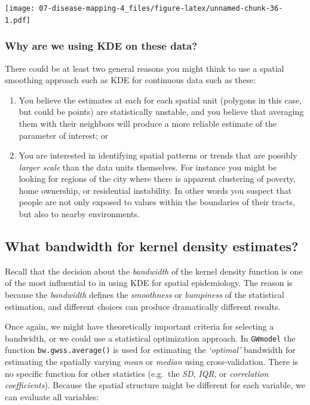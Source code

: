 \documentclass[
]{book}
\providecommand{\tightlist}{%
  \setlength{\itemsep}{0pt}\setlength{\parskip}{0pt}}
\begin{document}
\texttt{[image: 07-disease-mapping-4\_files/figure-latex/unnamed-chunk-36-1.pdf]}

\hypertarget{why-are-we-using-kde-on-these-data}{%
\subsubsection{Why are we using KDE on these data?}\label{why-are-we-using-kde-on-these-data}}

There could be at least two general reasons you might think to use a spatial smoothing approach such as KDE for continuous data such as these:

\begin{enumerate}
\def\labelenumi{\arabic{enumi}.}
\tightlist
\item
  You believe the estimates at each for each spatial unit (polygons in this case, but could be points) are statistically unstable, and you believe that averaging them with their neighbors will produce a more reliable estimate of the parameter of interest; or
\item
  You are interested in identifying spatial patterns or trends that are possibly \emph{larger scale} than the data units themselves. For instance you might be looking for regions of the city where there is apparent clustering of poverty, home ownership, or residential instability. In other words you suspect that people are not only exposed to values within the boundaries of their tracts, but also to nearby environments.
\end{enumerate}

\hypertarget{what-bandwidth-for-kernel-density-estimates}{%
\subsection{What bandwidth for kernel density estimates?}\label{what-bandwidth-for-kernel-density-estimates}}

Recall that the decision about the \emph{bandwidth} of the kernel density function is one of the most influential to in using KDE for spatial epidemiology. The reason is because the \emph{bandwidth} defines the \emph{smoothness} or \emph{bumpiness} of the statistical estimation, and different choices can produce dramatically different results.

Once again, we might have theoretically important criteria for selecting a bandwidth, or we could use a statistical optimization approach. In \texttt{GWmodel} the function \texttt{bw.gwss.average()} is used for estimating the \emph{`optimal'} bandwidth for estimating the spatially varying \emph{mean} or \emph{median} using cross-validation. There is no specific function for other statistics (e.g.~the \emph{SD}, \emph{IQR}, or \emph{correlation coefficients}). Because the spatial structure might be different for each variable, we can evaluate all variables:
\end{document}
